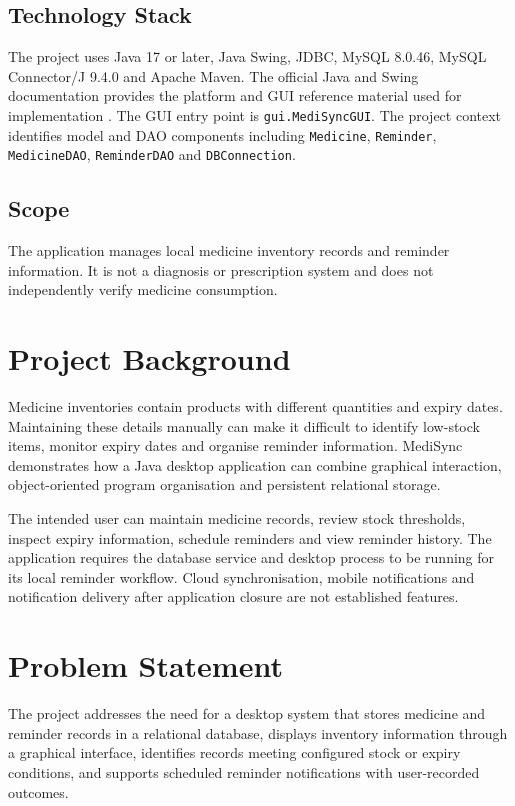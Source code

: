 \documentclass[12pt,a4paper,oneside]{report}
\begin{document}
\section{Technology Stack}
The project uses Java 17 or later, Java Swing, JDBC, MySQL 8.0.46, MySQL Connector/J 9.4.0 and Apache Maven. The official Java and Swing documentation provides the platform and GUI reference material used for implementation \cite{java,swing}. The GUI entry point is \texttt{gui.MediSyncGUI}. The project context identifies model and DAO components including \texttt{Medicine}, \texttt{Reminder}, \texttt{MedicineDAO}, \texttt{ReminderDAO} and \texttt{DBConnection}.

\section{Scope}
The application manages local medicine inventory records and reminder information. It is not a diagnosis or prescription system and does not independently verify medicine consumption.

\chapter{Project Background}
Medicine inventories contain products with different quantities and expiry dates. Maintaining these details manually can make it difficult to identify low-stock items, monitor expiry dates and organise reminder information. MediSync demonstrates how a Java desktop application can combine graphical interaction, object-oriented program organisation and persistent relational storage.

The intended user can maintain medicine records, review stock thresholds, inspect expiry information, schedule reminders and view reminder history. The application requires the database service and desktop process to be running for its local reminder workflow. Cloud synchronisation, mobile notifications and notification delivery after application closure are not established features.

\chapter{Problem Statement}
The project addresses the need for a desktop system that stores medicine and reminder records in a relational database, displays inventory information through a graphical interface, identifies records meeting configured stock or expiry conditions, and supports scheduled reminder notifications with user-recorded outcomes.
\end{document}
